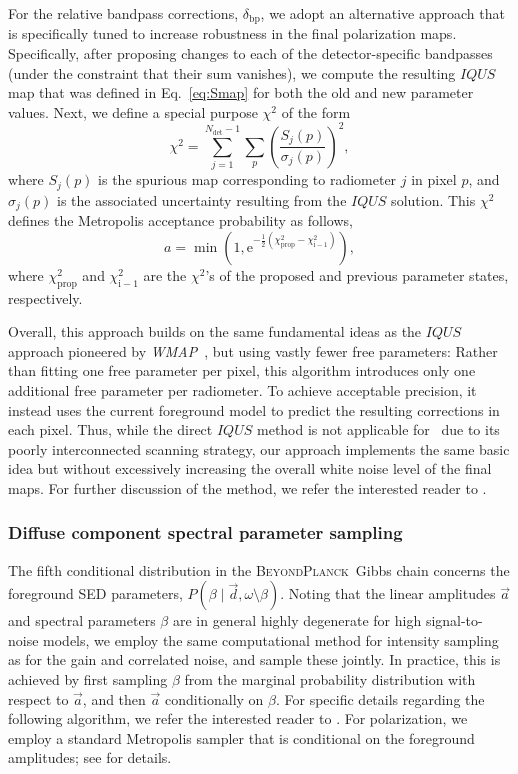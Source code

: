 \documentclass[twocolumn]{aa}
\def\WMAP{\emph{WMAP}}
\renewcommand{\d}[0]{\vec{d}}
\renewcommand{\a}[0]{\vec{a}}
\newcommand{\BP}{\textsc{BeyondPlanck}}
\newcommand{\e}{\mathrm e}
\begin{document}
For the relative bandpass corrections, $\delta_{\mathrm{bp}}$, we
adopt an alternative approach that is specifically tuned to increase
robustness in the final polarization maps. Specifically, after
proposing changes to each of the detector-specific bandpasses (under
the constraint that their sum vanishes), we compute the resulting
$IQUS$ map that was defined in Eq.~\eqref{eq:Smap} for both the old and
new parameter values. Next, we define a special purpose $\chi^2$ of
the form
\begin{equation}
  \chi^2 = \sum_{j=1}^{N_{\mathrm{det}}-1} \sum_p \left(\frac{S_j(p)}{\sigma_{j}(p)}\right)^2,
\end{equation}
where $S_j(p)$ is the spurious map corresponding to radiometer $j$ in
pixel $p$, and $\sigma_j(p)$ is the associated uncertainty resulting
from the $IQUS$ solution. This $\chi^2$ defines the Metropolis
acceptance probability as follows,
\begin{equation}
a = \min\left(1,\e^{-\frac{1}{2}(\chi^2_{\mathrm{prop}}-\chi^2_{\mathrm{i-1}})}\right),
\end{equation}
where $\chi^2_{\mathrm{prop}}$ and $\chi^2_{\mathrm{i-1}}$ are the
$\chi^2$'s of the proposed and previous parameter states, respectively.

Overall, this approach builds on the same fundamental ideas as the
$IQUS$ approach pioneered by \WMAP\ \citep{page2007}, but using vastly
fewer free parameters: Rather than fitting one free parameter per
pixel, this algorithm introduces only one additional free parameter
per radiometer. To achieve acceptable precision, it instead uses the
current foreground model to predict the resulting corrections in each
pixel. Thus, while the direct $IQUS$ method is not applicable for
\Planck\ due to its poorly interconnected scanning strategy, our
approach implements the same basic idea but without excessively
increasing the overall white noise level of the final maps. For
further discussion of the method, we refer the interested reader to
\citet{bp09}.

\subsubsection{Diffuse component spectral parameter sampling}
\label{sec:beta}  

The fifth conditional distribution in the \BP\ Gibbs chain concerns
the foreground SED parameters, $P(\beta\mid \d,
\omega\setminus\beta)$. Noting that the linear amplitudes $\a$ and
spectral parameters $\beta$ are in general highly degenerate for high
signal-to-noise models, we employ the same computational method for
intensity sampling as for the gain and correlated noise, and sample
these jointly. In practice, this is achieved by first sampling $\beta$
from the marginal probability distribution with respect to $\a$, and
then $\a$ conditionally on $\beta$. For specific details regarding the
following algorithm, we refer the interested reader to
\citet{bp13}. For polarization, we employ a standard Metropolis
sampler that is conditional on the foreground amplitudes; see
\citet{bp14} for details. 
\end{document}
